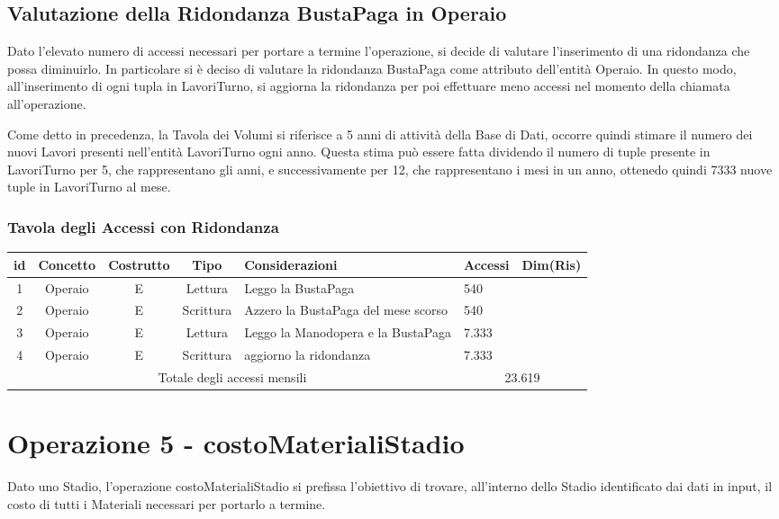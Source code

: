 \documentclass[12pt,a4paper]{report}
\begin{document}
            \subsection{Valutazione della Ridondanza BustaPaga in Operaio}
            Dato l'elevato numero di accessi necessari per portare a termine l'operazione, si decide di valutare l'inserimento di una ridondanza che possa diminuirlo. In particolare si è deciso di valutare la ridondanza BustaPaga come attributo dell'entità Operaio. In questo modo, all'inserimento di ogni tupla in LavoriTurno, si aggiorna la ridondanza per poi effettuare meno accessi nel momento della chiamata all'operazione.

            Come detto in precedenza, la Tavola dei Volumi si riferisce a 5 anni di attività della Base di Dati, occorre quindi stimare il numero dei nuovi Lavori presenti nell'entità LavoriTurno ogni anno. Questa stima può essere fatta dividendo il numero di tuple presente in LavoriTurno per 5, che rappresentano gli anni, e successivamente per 12, che rappresentano i mesi in un anno, ottenedo quindi 7333 nuove tuple in LavoriTurno al mese.

            \subsubsection{Tavola degli Accessi con Ridondanza}
            \begin{tabular}{|c|c|c|c|p{4cm}|p{3cm}|c|}
                \hline
                \textbf{id} & \textbf{Concetto} & \textbf{Costrutto} & \textbf{Tipo} & \textbf{Considerazioni} & \textbf{Accessi} & \textbf{Dim(Ris)} \\ \hline
                1 & Operaio & E & Lettura & Leggo la BustaPaga & 540 & ~ \\ \hline
                2 & Operaio & E & Scrittura & Azzero la BustaPaga del mese scorso & 540 & ~ \\ \hline
                3 & Operaio & E & Lettura & Leggo la Manodopera e la BustaPaga & 7.333 & ~ \\ \hline
                4 & Operaio & E & Scrittura & aggiorno la ridondanza & 7.333 & ~ \\ \hline
                \multicolumn{5}{|c|}{Totale degli accessi mensili} & \multicolumn{2}{|c|}{23.619} \\ \hline
            \end{tabular}

        \newpage

        \section{Operazione 5 - costoMaterialiStadio}
        Dato uno Stadio, l'operazione costoMaterialiStadio si prefissa l'obiettivo di trovare, all'interno dello Stadio identificato dai dati in input, il costo di tutti i Materiali necessari per portarlo a termine.
\end{document}
